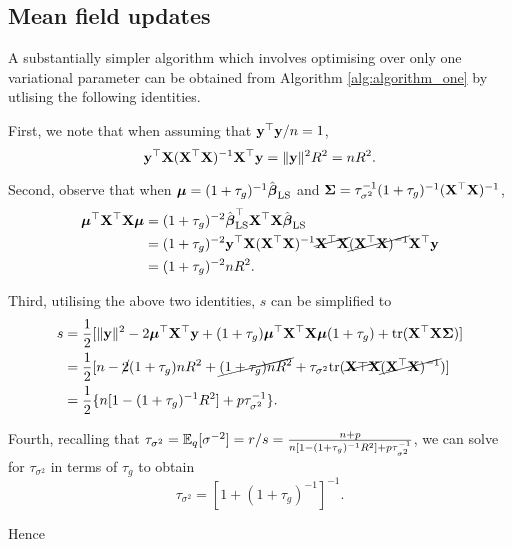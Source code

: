 \documentclass{amsart}[12pt]
\begin{document}
\subsection{Mean field updates}
\label{sec:mean_field_updates}

A substantially simpler algorithm  which involves optimising over only one variational parameter can be
obtained from Algorithm \ref{alg:algorithm_one} by utlising the following identities.

First, we note that when assuming that ${\bf y}^\top {\bf y} / n = 1$,
\[{\bf y}^\top {\bf X} ({\bf X}^\top {\bf X})^{-1} {\bf X}^\top {\bf y} =\|{\bf y}\|^2 R^2 = n R^2.\]

Second, observe that when ${\boldsymbol \mu} = (1 + \tau_g)^{-1} \hat{{\boldsymbol \beta}}_{\text{LS}}$ and ${\boldsymbol \Sigma} = \tau_{\sigma^2}^{-1} (1 + \tau_g)^{-1} ({\bf X}^\top {\bf X})^{-1}$,
\begin{align*}
	{\boldsymbol\mu}^\top {\bf X}^\top {\bf X} {\boldsymbol\mu} & = (1 + \tau_g)^{-2} \hat{{\boldsymbol \beta}}_{\text{LS}}^\top {\bf X}^\top {\bf X} \hat{{\boldsymbol \beta}}_{\text{LS}}                                                        \\
	                            & = (1 + \tau_g)^{-2} {\bf y}^\top {\bf X} ({\bf X}^\top {\bf X})^{-1} \cancel{{\bf X}^\top {\bf X}} \cancel{({\bf X}^\top {\bf X})^{-1}} {\bf X}^\top {\bf y} \\
	                            & = (1 + \tau_g)^{-2} n R^2.                                                                                           
\end{align*}

Third, utilising the above two identities, $s$ can be simplified to
\begin{align*}
	s & = \frac{1}{2} [\|{\bf y}\|^2 - 2 {\boldsymbol \mu}^\top {\bf X}^\top {\bf y} + (1 + \tau_g) {\boldsymbol \mu}^\top {\bf X}^\top {\bf X} {\boldsymbol\mu} (1 + \tau_g) +  \text{tr} ({\bf X}^\top {\bf X} {\boldsymbol\Sigma})]                 \\
	  & = \frac{1}{2} [n - \cancel{2} (1 + \tau_g) n R ^2 + \cancel{(1 + \tau_g) n R^2} + \tau_{\sigma^2} \text{tr} (\cancel{{\bf X}\top {\bf X}} \cancel{({\bf X}^\top {\bf X})^{-1}})] \\
	  & = \frac{1}{2} \{ n[1 - (1 + \tau_g)^{-1} R^2] + p \tau_{\sigma^2}^{-1} \}.                                                                                 
\end{align*}

Fourth, recalling that $\tau_{\sigma^2} = \mathbb{E}_q [\sigma^{-2}] = r/s = \frac{n+p}{n[1 - (1 + \tau_g)^{-1} R^2] + p \tau_{\sigma^2}^{-1}}$, we can solve for $\tau_{\sigma^2}$ in terms of $\tau_g$ to obtain
\[
	\tau_{\sigma^2} = [1 + (1 + \tau_g)^{-1}]^{-1}.
\]

Hence
\end{document}
